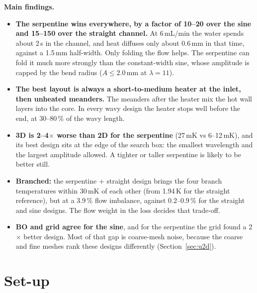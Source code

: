 \documentclass[11pt,a4paper]{article}
\newcommand{\mK}{\ensuremath{\,\mathrm{mK}}}
\newcommand{\K}{\ensuremath{\,\mathrm{K}}}
\newcommand{\mm}{\ensuremath{\,\mathrm{mm}}}
\begin{document}
\textbf{Main findings.}
\begin{itemize}
  \item \textbf{The serpentine wins everywhere, by a factor of 10--20 over the sine and 15--150 over
        the straight channel.} At 6\,mL/min the water spends about 2\,s in the channel, and heat diffuses
        only about 0.6\mm{} in that time, against a 1.5\mm{} half-width. Only folding the flow helps.
        The serpentine can fold it much more strongly than the constant-width sine, whose amplitude is
        capped by the bend radius ($A \le 2.0\mm$ at $\lambda = 11$).
  \item \textbf{The best layout is always a short-to-medium heater at the inlet, then unheated meanders.}
        The meanders after the heater mix the hot wall layers into the core. In every wavy design the
        heater stops well before the end, at 30--80\,\% of the wavy length.
  \item \textbf{3D is 2--4$\times$ worse than 2D for the serpentine} (27\mK{} vs 6--12\mK), and its
        best design sits at the edge of the search box: the smallest wavelength and the largest amplitude
        allowed. A tighter or taller serpentine is likely to be better still.
  \item \textbf{Branched:} the serpentine + straight design brings the four branch temperatures within
        30\mK{} of each other (from 1.94\K{} for the straight reference), but at a 3.9\,\% flow imbalance,
        against 0.2--0.9\,\% for the straight and sine designs. The flow weight in the loss decides that trade-off.
  \item \textbf{BO and grid agree for the sine}, and for the serpentine the grid found a 2$\times$ better
        design. Most of that gap is coarse-mesh noise, because the coarse and fine meshes rank these
        designs differently (Section~\ref{sec:u2d}).
\end{itemize}

\section{Set-up}
\end{document}
